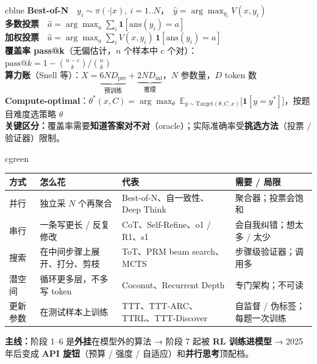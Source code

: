 \documentclass[8pt]{extarticle}
\begin{document}
\begin{minipage}[t]{0.40\linewidth}\vspace{0pt}
\begin{tbox}[title={统一形式化：用推理算力换准确率}]{cblue}
\small
\textbf{Best-of-N}\ \ $y_i\sim\pi(\cdot|x),\ i=1..N$，\ $\hat y=\arg\max_{y_i}V(x,y_i)$\\
\textbf{多数投票}\ \ $\hat a=\arg\max_a\sum_i\mathbf{1}[\mathrm{ans}(y_i)=a]$\\
\textbf{加权投票}\ \ $\hat a=\arg\max_a\sum_i V(x,y_i)\,\mathbf{1}[\mathrm{ans}(y_i)=a]$\\
\textbf{覆盖率 pass@k}（无偏估计，$n$ 个样本中 $c$ 个对）：\\
\hspace*{1em}$\text{pass@}k=1-\binom{n-c}{k}\big/\binom{n}{k}$\\
\textbf{算力账}（Snell 等）：$X=\underbrace{6ND_{\text{pre}}}_{\text{预训练}}+\underbrace{2ND_{\text{inf}}}_{\text{推理}}$，$N$ 参数量，$D$ token 数\\
\textbf{Compute-optimal}：$\theta^*(x,C)=\arg\max_\theta\ \mathbb{E}_{y\sim\mathrm{Target}(\theta,C,x)}\big[\mathbf{1}[y=y^*]\big]$，按题目难度选策略 $\theta$\\[2pt]
\textbf{关键区分：}覆盖率需要\textbf{知道答案对不对}（oracle）；实际准确率受\textbf{挑选方法}（投票 / 验证器）限制。
\end{tbox}
\end{minipage}\hfill
\begin{minipage}[t]{0.585\linewidth}\vspace{0pt}
\begin{tbox}[title={五种花推理算力的方式}]{cgreen}
\small
\begin{tabularx}{\linewidth}{@{}p{1.15cm} p{2.9cm} p{4.4cm} Y@{}}
\toprule
方式 & 怎么花 & 代表 & 需要 / 局限\\\midrule
{\color{cblue}并行} & 独立采 $N$ 个再聚合 & Best-of-N、自一致性、Deep Think & 聚合器；投票会饱和\\
{\color{cblue}串行} & 一条写更长 / 反复修改 & CoT、Self-Refine、o1 / R1、s1 & 会自我纠错；想太多 / 太少\\
{\color{cblue}搜索} & 在中间步骤上展开、打分、剪枝 & ToT、PRM beam search、MCTS & 步骤级验证器；调用多\\
{\color{cblue}潜空间} & 循环更多层，不多写 token & Coconut、Recurrent Depth & 专门架构；不可读\\
{\color{cred}更新参数} & 在测试样本上训练 & TTT、TTT-ARC、TTRL、TTT-Discover & 自监督 / 伪标签；每题一次训练\\
\bottomrule
\end{tabularx}
\textbf{主线：}阶段 1–6 是\textbf{外挂}在模型外的算法 → 阶段 7 起被 \textbf{RL 训练进模型} → 2025 年后变成 \textbf{API 旋钮}（预算 / 强度 / 自适应）和\textbf{并行思考}顶配档。
\end{tbox}
\end{minipage}
\end{document}
